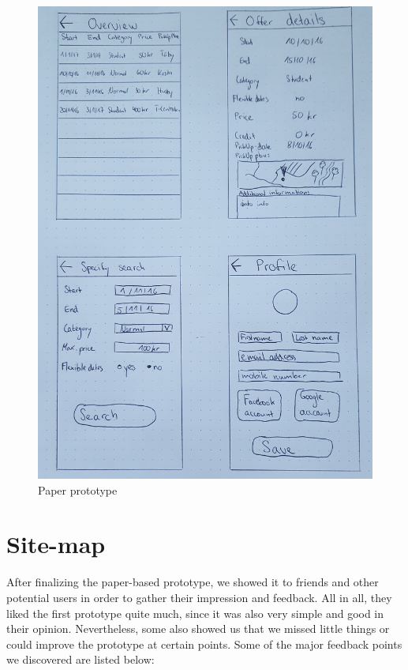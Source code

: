 \documentclass[11pt,twoside,a4paper]{report}
\begin{document}
\begin{figure}
	\centering
	\includegraphics[width=\textwidth]{Paper_prototype2.jpg}
	\caption{Paper prototype}
	\label{paper prototype 2}
\end{figure}

\newpage
\section{Site-map}

After finalizing the paper-based prototype, we showed it to friends and other potential users in order to gather their impression and feedback. All in all, they liked the first prototype quite much, since it was also very simple and good in their opinion. Nevertheless, some also showed us that we missed little things or could improve the prototype at certain points. Some of the major feedback points we discovered are listed below:
\end{document}
